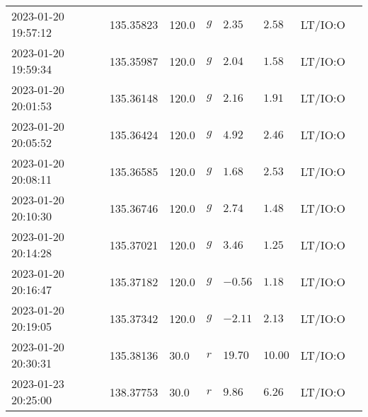 \documentclass{nature_plusfigure}
\begin{document}
\begin{supplement}
\begin{center}
\begin{longtable}{llllllll}
2023-01-20 19:57:12 & 135.35823 & 120.0 & $g$ & $2.35$ & $2.58$ & LT/IO:O &  \\ 
2023-01-20 19:59:34 & 135.35987 & 120.0 & $g$ & $2.04$ & $1.58$ & LT/IO:O &  \\ 
2023-01-20 20:01:53 & 135.36148 & 120.0 & $g$ & $2.16$ & $1.91$ & LT/IO:O &  \\ 
2023-01-20 20:05:52 & 135.36424 & 120.0 & $g$ & $4.92$ & $2.46$ & LT/IO:O &  \\ 
2023-01-20 20:08:11 & 135.36585 & 120.0 & $g$ & $1.68$ & $2.53$ & LT/IO:O &  \\ 
2023-01-20 20:10:30 & 135.36746 & 120.0 & $g$ & $2.74$ & $1.48$ & LT/IO:O &  \\ 
2023-01-20 20:14:28 & 135.37021 & 120.0 & $g$ & $3.46$ & $1.25$ & LT/IO:O &  \\ 
2023-01-20 20:16:47 & 135.37182 & 120.0 & $g$ & $-0.56$ & $1.18$ & LT/IO:O &  \\ 
2023-01-20 20:19:05 & 135.37342 & 120.0 & $g$ & $-2.11$ & $2.13$ & LT/IO:O &  \\ 
2023-01-20 20:30:31 & 135.38136 & 30.0 & $r$ & $19.70$ & $10.00$ & LT/IO:O &  \\ 
2023-01-23 20:25:00 & 138.37753 & 30.0 & $r$ & $9.86$ & $6.26$ & LT/IO:O &  \\ 
\hline 
\end{longtable} 
\end{center} 


\clearpage


\end{supplement}
\end{document}
